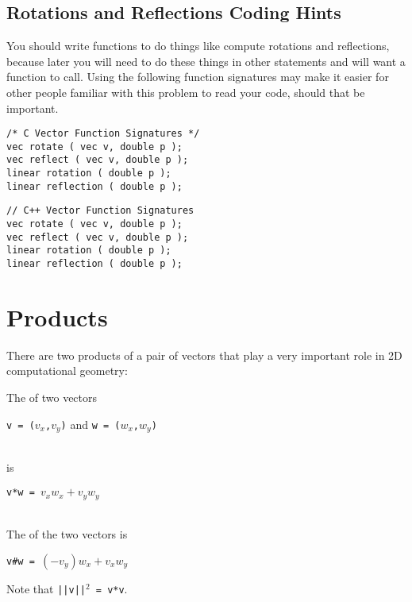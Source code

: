 \documentclass[12pt]{article}
\begin{document}
\subsection{Rotations and Reflections Coding Hints}

You should write functions to do things like compute rotations
and reflections,
because later you will need to do these things in other
statements and will want a function to call.  Using the following
function signatures may make it easier
for other people familiar with this problem to read your
code, should that be important.

\hspace*{0.3in}\begin{minipage}{5.0in}
\begin{verbatim}
/* C Vector Function Signatures */
vec rotate ( vec v, double p );
vec reflect ( vec v, double p );
linear rotation ( double p );
linear reflection ( double p );
\end{verbatim}
\end{minipage}

\bigskip

\hspace*{0.3in}\begin{minipage}{5.0in}
\begin{verbatim}
// C++ Vector Function Signatures
vec rotate ( vec v, double p );
vec reflect ( vec v, double p );
linear rotation ( double p );
linear reflection ( double p );
\end{verbatim}
\end{minipage}

\section{Products}
There are two products of a pair of vectors that play a
very important role in 2D computational geometry:

\begin{definition}
The  of two vectors \\
\centerline{{\tt v = ($v_x$,$v_y$)} and {\tt w = ($w_x$,$w_y$)}} \\
is \\
\centerline{\tt v*w = $v_x w_x + v_y w_y$} \\
The  of the two vectors is \\
\centerline{\tt v\#w = $(-v_y)w_x + v_x w_y$}
\end{definition}

Note that {\tt ||v||$^2$ = v*v}.
\end{document}
